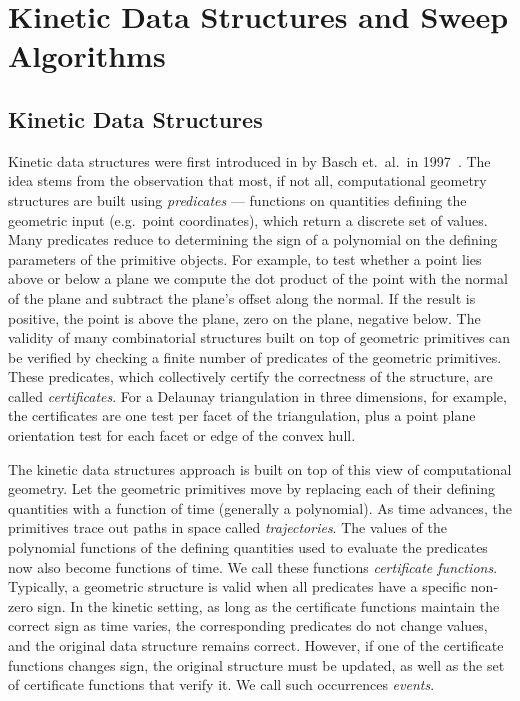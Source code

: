 \section{Kinetic Data Structures and Sweep Algorithms}
\label{sec:kds_intro}


\subsection{Kinetic Data Structures}
Kinetic data structures were first introduced in by Basch et.\ al.\ in
1997~\cite{cgal:bgh-dsmd-97}.  The idea stems from the observation that
most, if not all, computational geometry structures are built using
{\em predicates} --- functions on quantities defining the geometric
input (e.g.\ point coordinates), which return a discrete set of
values. Many predicates reduce to determining the sign of a polynomial
on the defining parameters of the primitive objects. For example, to
test whether a point lies above or below a plane we compute the dot
product of the point with the normal of the plane and subtract the
plane's offset along the normal. If the result is positive, the point
is above the plane, zero on the plane, negative below. The validity of
many combinatorial structures built on top of geometric primitives can
be verified by checking a finite number of predicates of the geometric
primitives.  These predicates, which collectively certify the
correctness of the structure, are called {\em certificates}.  For a
Delaunay triangulation in three dimensions, for example, the
certificates are one  test per facet of the
triangulation, plus a point plane orientation test for each facet or
edge of the convex hull.

The kinetic data structures approach is built on top of this view of
computational geometry. Let the geometric primitives move by replacing
each of their defining quantities with a function of time (generally a
polynomial). As time advances, the primitives trace out paths in
space called {\em trajectories}. The values of the polynomial
functions of the defining quantities used to evaluate the predicates now
also become functions of time. We call these functions
{\em certificate functions}. Typically, a geometric structure is valid when
all predicates have a specific non-zero sign. In the kinetic setting,
as long as the certificate functions maintain the correct sign as time varies,
the corresponding predicates do not change values,
and the original data structure remains correct. However, if
one of the certificate functions changes sign, the original structure
must be updated, as well as the set of certificate functions that
verify it.  We call such occurrences {\em events}.

